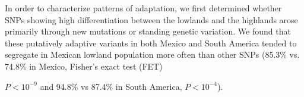 In order to characterize patterns of adaptation, we first determined whether SNPs showing high differentiation between the lowlands and the highlands arose primarily through new mutations or standing genetic variation.  
We found that these putatively adaptive variants in both Mexico and South America tended to segregate in Mexican lowland population more often than other SNPs (85.3\% vs. 74.8\% in Mexico, Fisher's exact test (FET) {$P < 10^{-9}$ and 94.8\% vs 87.4\% in South America,  $P< 10^{-4}$).  


}
